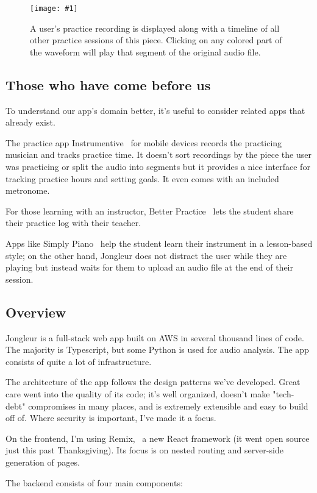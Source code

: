 \documentclass{article}
\newcommand{\screenshot}[2]{
  \begin{figure}[h]
    \texttt{[image: \#1]}
    \caption*{#2}
  \end{figure}
}
\begin{document}
\screenshot{jong-practice}{A user's practice recording is displayed along with a timeline of all other practice sessions of this piece. Clicking on any colored part of the waveform will play that segment of the original audio file.}

\subsection{Those who have come before us}

To understand our app's domain better, it's useful to consider related apps that already exist.

The practice app Instrumentive~\cite{instrumentive} for mobile devices records the practicing musician and tracks practice time.
It doesn't sort recordings by the piece the user was practicing or split the audio into segments but it provides a nice interface for tracking practice hours and setting goals.
It even comes with an included metronome.

For those learning with an instructor, Better Practice~\cite{better-practice} lets the student share their practice log with their teacher.

Apps like Simply Piano~\cite{simply-piano} help the student learn their instrument in a lesson-based style; on the other hand, Jongleur does not distract the user while they are playing but instead waits for them to upload an audio file at the end of their session.

\subsection{Overview}
Jongleur is a full-stack web app built on AWS in several thousand lines of code.
The majority is Typescript, but some Python is used for audio analysis.
The app consists of quite a lot of infrastructure.

The architecture of the app follows the design patterns we've developed.
Great care went into the quality of its code; it's well organized, doesn't make "tech-debt" compromises in many places, and is extremely extensible and easy to build off of.
Where security is important, I've made it a focus.

On the frontend, I'm using Remix,~\cite{remix} a new React framework (it went open source just this past Thanksgiving).
Its focus is on nested routing and server-side generation of pages.

The backend consists of four main components:
\end{document}
